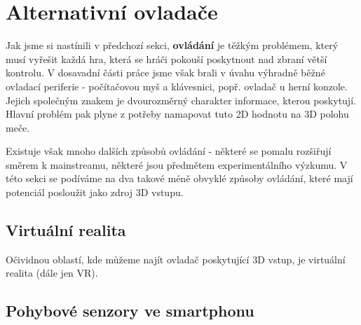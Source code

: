 \section{Alternativní ovladače} \label{alternativeControllers}

Jak jsme si nastínili v předchozí sekci, \textbf{ovládání} je těžkým problémem, který musí vyřešit každá hra, která se hráči pokouší poskytnout nad zbraní větší kontrolu. V dosavadní části práce jsme však brali v úvahu výhradně běžné ovladací periferie - počítačovou myš a klávesnici, popř. ovladač u herní konzole. Jejich společným znakem je dvourozměrný charakter informace, kterou poskytují. Hlavní problém pak plyne z potřeby namapovat tuto 2D hodnotu na 3D polohu meče. 

Existuje však mnoho dalších způsobů ovládání - některé se pomalu rozšiřují směrem k mainstreamu, některé jsou předmětem experimentálního výzkumu. 
V této sekci se podíváme na dva takové méně obvyklé způsoby ovládání, které mají potenciál posloužit jako zdroj 3D vstupu.

\subsection{Virtuální realita} \label{VRControllers}

Očividnou oblastí, kde můžeme najít ovladač poskytující 3D vstup, je virtuální realita (dále jen \acs{VR}). 







\subsection{Pohybové senzory ve smartphonu}



